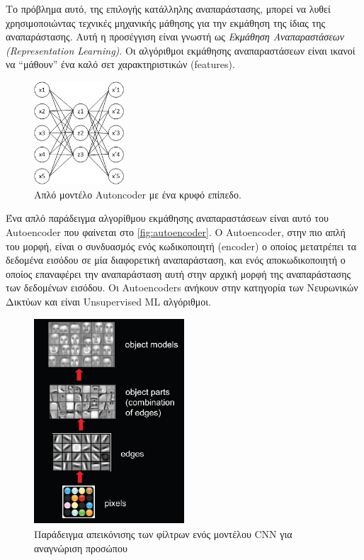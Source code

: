 Το πρόβλημα αυτό, της επιλογής κατάλληλης αναπαράστασης, μπορεί να λυθεί
χρησιμοποιώντας τεχνικές μηχανικής μάθησης για την εκμάθηση της ίδιας
της αναπαράστασης. Αυτή η προσέγγιση είναι γνωστή ως
\emph{Εκμάθηση Αναπαραστάσεων (Representation Learning)}. Οι αλγόριθμοι
εκμάθησης αναπαραστάσεων είναι ικανοί να “μάθουν” ένα καλό σετ χαρακτηριστικών (features).
\begin{figure}[!ht]
  \centering
  \includegraphics[width=0.3\textwidth]{./images/chapter3/autoencoder.png}
  \caption[Απλό μοντέλο Autoncoder με ένα κρυφό επίπεδο]{Απλό μοντέλο Autoncoder με ένα κρυφό επίπεδο.}
  \label{fig:autoencoder}
\end{figure}
Ένα απλό παράδειγμα αλγορίθμου εκμάθησης αναπαραστάσεων είναι αυτό του
Autoencoder \cite{baldi2012autoencoders} που φαίνεται στο \autoref{fig:autoencoder}.
Ο Autoencoder, στην πιο απλή του μορφή, είναι ο συνδυασμός ενός κωδικοποιητή (encoder) ο οποίος μετατρέπει
τα δεδομένα εισόδου σε μία διαφορετική αναπαράσταση, και ενός αποκωδικοποιητή
ο οποίος επαναφέρει την αναπαράσταση αυτή στην αρχική μορφή της αναπαράστασης των
δεδομένων εισόδου. Οι Autoencoders ανήκουν στην κατηγορία των Νευρωνικών
Δικτύων και είναι Unsupervised ML αλγόριθμοι.
\begin{figure}[!ht]
  \centering
  \includegraphics[width=0.5\textwidth]{./images/chapter3/cnn_deeper.jpg}
  \caption[Παράδειγμα απεικόνισης των φίλτρων ενός μοντέλου CNN για αναγνώριση προσώπου]{Παράδειγμα απεικόνισης των φίλτρων ενός μοντέλου CNN για αναγνώριση προσώπου}
  \label{fig:cnn_filter_visualization}
\end{figure}
